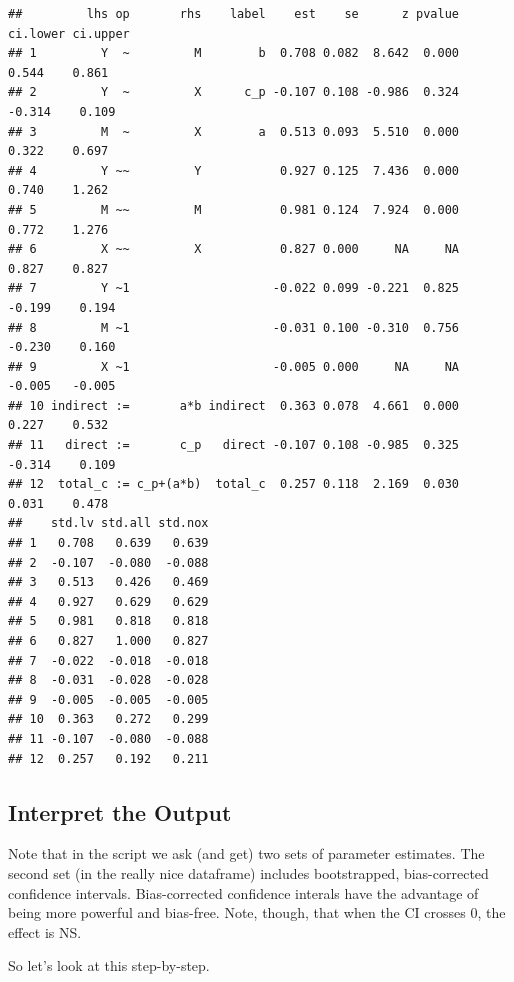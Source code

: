 \documentclass[
  11pt,
]{book}
\begin{document}
\begin{verbatim}
##         lhs op       rhs    label    est    se      z pvalue ci.lower ci.upper
## 1         Y  ~         M        b  0.708 0.082  8.642  0.000    0.544    0.861
## 2         Y  ~         X      c_p -0.107 0.108 -0.986  0.324   -0.314    0.109
## 3         M  ~         X        a  0.513 0.093  5.510  0.000    0.322    0.697
## 4         Y ~~         Y           0.927 0.125  7.436  0.000    0.740    1.262
## 5         M ~~         M           0.981 0.124  7.924  0.000    0.772    1.276
## 6         X ~~         X           0.827 0.000     NA     NA    0.827    0.827
## 7         Y ~1                    -0.022 0.099 -0.221  0.825   -0.199    0.194
## 8         M ~1                    -0.031 0.100 -0.310  0.756   -0.230    0.160
## 9         X ~1                    -0.005 0.000     NA     NA   -0.005   -0.005
## 10 indirect :=       a*b indirect  0.363 0.078  4.661  0.000    0.227    0.532
## 11   direct :=       c_p   direct -0.107 0.108 -0.985  0.325   -0.314    0.109
## 12  total_c := c_p+(a*b)  total_c  0.257 0.118  2.169  0.030    0.031    0.478
##    std.lv std.all std.nox
## 1   0.708   0.639   0.639
## 2  -0.107  -0.080  -0.088
## 3   0.513   0.426   0.469
## 4   0.927   0.629   0.629
## 5   0.981   0.818   0.818
## 6   0.827   1.000   0.827
## 7  -0.022  -0.018  -0.018
## 8  -0.031  -0.028  -0.028
## 9  -0.005  -0.005  -0.005
## 10  0.363   0.272   0.299
## 11 -0.107  -0.080  -0.088
## 12  0.257   0.192   0.211
\end{verbatim}

\hypertarget{interpret-the-output}{%
\subsection{Interpret the Output}\label{interpret-the-output}}

Note that in the script we ask (and get) two sets of parameter estimates. The second set (in the really nice dataframe) includes bootstrapped, bias-corrected confidence intervals. Bias-corrected confidence interals have the advantage of being more powerful and bias-free. Note, though, that when the CI crosses 0, the effect is NS.

So let's look at this step-by-step.
\end{document}
